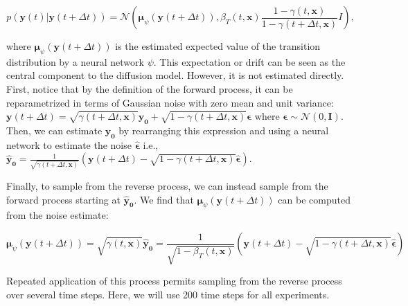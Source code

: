 \begin{equation*}
p\left(\mathbf{y}\left(t\right)\lvert\mathbf{y}\left(t+\Delta t\right)\right)=\mathcal{N}\left(\boldsymbol{\mu}_{\psi}\left(\mathbf{y}\left(t+\Delta t\right)\right),\beta_T\left(t,\mathbf{x}\right)\frac{1-\gamma\left(t,\mathbf{x}\right)}{1-\gamma\left(t+\Delta t,\mathbf{x}\right)}I\right),
\end{equation*}

where $\boldsymbol{\mu}_{\psi}\left(\mathbf{y}\left(t+\Delta t\right)\right)$ is the estimated expected value of the transition distribution by a neural network $\psi$. This expectation or drift can be seen as the central component to the diffusion model. However, it is not estimated directly. First, notice that by the definition of the forward process, it can be reparametrized in terms of Gaussian noise with zero mean and unit variance: $\mathbf{y}\left(t+\Delta t\right)=\sqrt{\gamma\left(t+\Delta t,\mathbf{x}\right)}\mathbf{y}_\mathbf{0}+\sqrt{1-\gamma\left(t+\Delta t,\mathbf{x}\right)}\boldsymbol{\epsilon}$ where $\boldsymbol{\epsilon}\sim\mathcal{N}\left(0,\mathbf{I}\right)$. Then, we can estimate $\mathbf{y}_\mathbf{0}$ by rearranging this expression and using a neural network to estimate the noise $\hat{\boldsymbol{\epsilon}}$ i.e., ${\hat{\mathbf{y}}}_\mathbf{0}=\frac{1}{\sqrt{\gamma\left(t+\Delta t,\mathbf{x}\right)}}\left(\mathbf{y}\left(t+\Delta t\right)-\sqrt{1-\gamma\left(t+\Delta t,\mathbf{x}\right)}\hat{\boldsymbol{\epsilon}}\right)$. 

Finally, to sample from the reverse process, we can instead sample from the forward process starting at ${\hat{\mathbf{y}}}_\mathbf{0}$. We find that $\boldsymbol{\mu}_{\psi}\left(\mathbf{y}\left(t+\Delta t\right)\right)$ can be computed from the noise estimate:

\begin{equation*}
\boldsymbol{\mu}_\psi\left(\mathbf{y}\left(t+\Delta t\right)\right)=\sqrt{\gamma\left(t,\mathbf{x}\right)}{\hat{\mathbf{y}}}_\mathbf{0}=\frac{1}{\sqrt{1-\beta_T\left(t,\mathbf{x}\right)}}\left(\mathbf{y}\left(t+\Delta t\right)-\sqrt{1-\gamma\left(t+\Delta t,\mathbf{x}\right)}\hat{\boldsymbol{\epsilon}}\right)
\end{equation*}

Repeated application of this process permits sampling from the reverse process over several time steps. Here, we will use 200 time steps for all experiments. 



